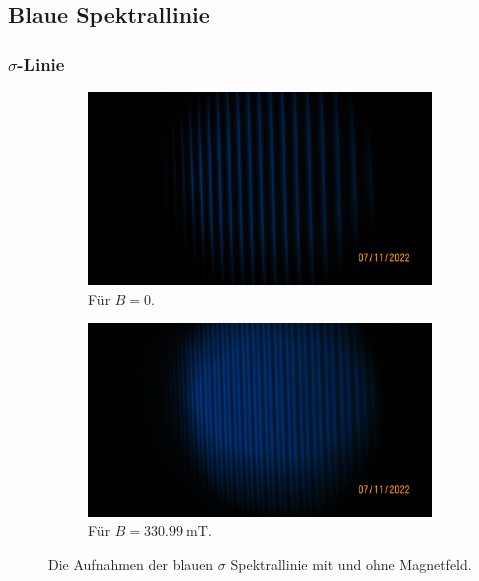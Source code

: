  
\subsection{Blaue Spektrallinie}

  \noindent 

  \subsubsection{$\sigma$-Linie}

    \noindent 

    \begin{figure}%
      \begin{subfigure}{0.48\textwidth}%
        \centering%
        \includegraphics{../pictures/IMG_0007.JPG}%
        \caption{Für $B = \num{0}$.}%
        \label{fig:pic_blaus_0}%
      \end{subfigure}%
      \hfill%
      \begin{subfigure}{0.48}%
        \centering%
        \includegraphics{../pictures/IMG_0008.JPG}%
        \caption{Für $B = \SI{330.99}{\milli\tesla}$.}%
        \label{fig:pic_blaus_B}%
      \end{subfigure}%
      \caption{Die Aufnahmen der blauen $\sigma$ Spektrallinie mit und ohne Magnetfeld.}%
      \label{fig:blaus}%
    \end{figure}

